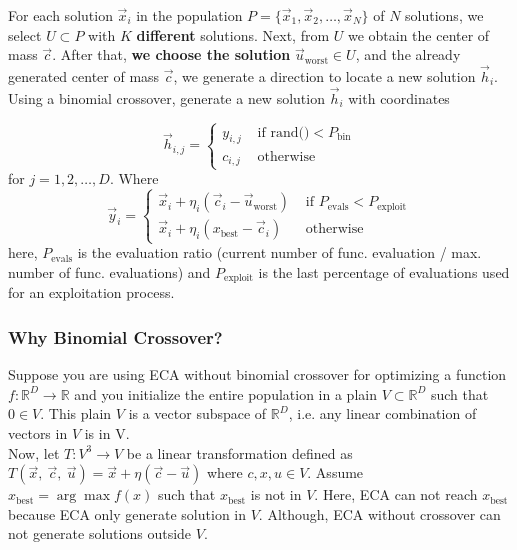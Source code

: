 \documentclass[12pt,letterpape]{article}
\begin{document}
For each solution $\vec{x}_i $ in the population 
$P = \{ \vec{x}_1, \vec{x}_2, \ldots, \vec{x}_{N} \} $ of $N$ 
solutions, we select $U \subset P $ with $K$ \textbf{different} solutions. Next, 
from $U$ we obtain the center of mass $\vec{c}$. After that, \textbf{we choose the solution}
$\vec{u}_{\text{worst}} \in U$, and the already generated center of mass $\vec{c}$,
we generate a direction to locate a new solution $ \vec{h}_i$. Using a binomial 
crossover, generate a new solution $\vec{h}_{i}$ with coordinates

%
\begin{equation}
	\vec{h}_{i,j} = 
	\begin{cases}
		y_{i,j} & \text{ if rand()} < P_{\text{bin}}\\
		c_{i,j} & \text{ otherwise}
	\end{cases}
	\label{eqn:newSol}
\end{equation}
% 
for $j = 1,2,\ldots,D$. Where 
%
\begin{equation}
	\vec{y}_i = 
	\begin{cases}
		\vec{x}_i + \eta _{i} ( \vec{c}_i - \vec{u}_{ \text{worst} } ) 
		       & \text{ if } P_{\text{evals}} < P_{\text{exploit}} \\
		\vec{x}_i + \eta _{i} ( x_{\text{best}} - \vec{c}_i)
		       & \text{ otherwise}
	\end{cases}
	\label{eqn:vcu}
\end{equation}
%
here, $ P_{\text{evals}}$ is the evaluation ratio (current number of func. evaluation / max.
number of func. evaluations) and  $P_{\text{exploit}}$ is the last percentage of
evaluations used for an exploitation process.
%


\subsubsection{Why Binomial Crossover?} %
\label{sub:why_binomial_crossover_}

Suppose you are using ECA without binomial crossover for optimizing a function 
$f:\mathbb{R}^D \to \mathbb{R}$ and you initialize the entire population in a 
plain $V \subset \mathbb{R}^D $ such that $0 \in V$. This plain $V$ is a vector 
subspace of $\mathbb{R}^D$, i.e. any linear combination of vectors in $V$ is in V.\\

Now, let $T:V^3 \to V$ be a linear transformation defined as 
$ T(\vec{x},\ \vec{c},\ \vec{u}) = \vec{x} + \eta ( \vec{c} - \vec{u} )$ where 
$c,x,u \in V$. Assume $x_\text{best} = \arg \max f(x)$ such that $x_\text{best} $
is not in $V$. Here, ECA can not reach $x_\text{best}$ because ECA only generate
solution in $V$. Although, ECA without crossover can not generate solutions outside $V$.
\end{document}
